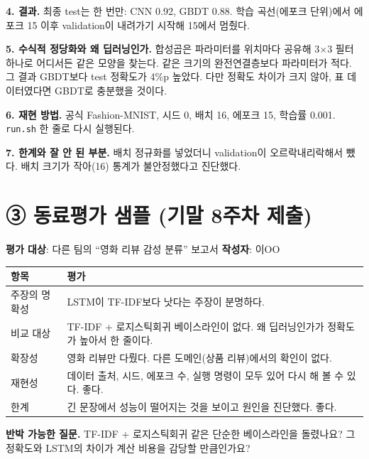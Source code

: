 \documentclass[11pt]{article}
\begin{document}
\noindent\textbf{4. 결과.} 최종 test는 한 번만: CNN 0.92, GBDT 0.88. 학습 곡선(에포크 단위)에서 에포크 15 이후 validation이 내려가기 시작해 15에서 멈췄다.

\noindent\textbf{5. 수식적 정당화와 왜 딥러닝인가.} 합성곱은 파라미터를 위치마다 공유해 3$\times$3 필터 하나로 어디서든 같은 모양을 찾는다. 같은 크기의 완전연결층보다 파라미터가 적다. 그 결과 GBDT보다 test 정확도가 4\%p 높았다. 다만 정확도 차이가 크지 않아, 표 데이터였다면 GBDT로 충분했을 것이다.

\noindent\textbf{6. 재현 방법.} 공식 Fashion-MNIST, 시드 0, 배치 16, 에포크 15, 학습률 0.001. \texttt{run.sh} 한 줄로 다시 실행된다.

\noindent\textbf{7. 한계와 잘 안 된 부분.} 배치 정규화를 넣었더니 validation이 오르락내리락해서 뺐다. 배치 크기가 작아(16) 통계가 불안정했다고 진단했다.

\newpage
\section*{③ 동료평가 샘플 (기말 8주차 제출)}
\noindent\textbf{평가 대상}: 다른 팀의 ``영화 리뷰 감성 분류'' 보고서 \quad \textbf{작성자}: 이OO

\begin{center}\small
\begin{tabular}{@{}p{3.4cm}p{9cm}@{}}\toprule
항목 & 평가 \\\midrule
주장의 명확성 & LSTM이 TF-IDF보다 낫다는 주장이 분명하다. \\
비교 대상 & TF-IDF + 로지스틱회귀 베이스라인이 없다. 왜 딥러닝인가가 정확도가 높아서 한 줄이다. \\
확장성 & 영화 리뷰만 다뤘다. 다른 도메인(상품 리뷰)에서의 확인이 없다. \\
재현성 & 데이터 출처, 시드, 에포크 수, 실행 명령이 모두 있어 다시 해 볼 수 있다. 좋다. \\
한계 & 긴 문장에서 성능이 떨어지는 것을 보이고 원인을 진단했다. 좋다. \\
\bottomrule\end{tabular}\end{center}

\noindent\textbf{반박 가능한 질문.} TF-IDF + 로지스틱회귀 같은 단순한 베이스라인을 돌렸나요? 그 정확도와 LSTM의 차이가 계산 비용을 감당할 만큼인가요?
\end{document}

